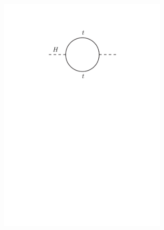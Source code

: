 \begin{figure}[tb]
  \begin{center}
   \begin{subfigure}{0.32\textwidth}
  	\includegraphics[width=0.92\textwidth]{Theory/FeynmanGraphs/loop_toptop_good}
    \caption{} \end{subfigure}
   \begin{subfigure}{0.32\textwidth}

\end{subfigure}
\end{center}
\end{figure}
